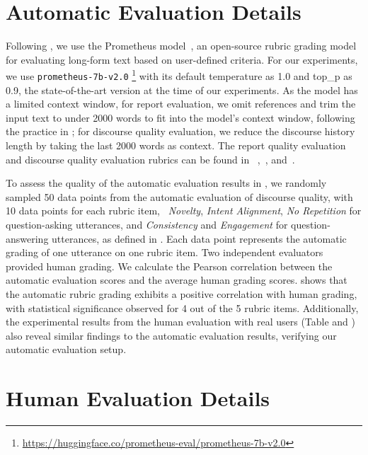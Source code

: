 \documentclass[11pt]{article}
\begin{document}
\section{Automatic Evaluation Details}
\label{appendix:rubric}
Following \citet{shao2024assisting}, we use the Prometheus model~\citep{kim2024prometheus}, an open-source rubric grading model for evaluating long-form text based on user-defined criteria. For our experiments, we use \texttt{prometheus-7b-v2.0} \footnote{\url{https://huggingface.co/prometheus-eval/prometheus-7b-v2.0}} with its default temperature as 1.0 and top\_p as 0.9, the state-of-the-art version at the time of our experiments. As the model has a limited context window, for report evaluation, we omit references and trim the input text to under 2000 words to fit into the model’s context window, following the practice in \citet{shao2024assisting}; for discourse quality evaluation, we reduce the discourse history length by taking the last 2000 words as context. The report quality evaluation and discourse quality evaluation rubrics can be found in ~,~, and~.

To assess the quality of the automatic evaluation results in , we randomly sampled 50 data points from the automatic evaluation of discourse quality, with 10 data points for each rubric item, \ie ~\textit{Novelty}, \textit{Intent Alignment}, \textit{No Repetition} for question-asking utterances, and \textit{Consistency} and \textit{Engagement} for question-answering utterances, as defined in . Each data point represents the automatic grading of one utterance on one rubric item. Two independent evaluators provided human grading. We calculate the Pearson correlation between the automatic evaluation scores and the average human grading scores.  shows that the automatic rubric grading exhibits a positive correlation with human grading, with statistical significance observed for 4 out of the 5 rubric items. Additionally, the experimental results from the human evaluation with real users (Table  and ) also reveal similar findings to the automatic evaluation results, verifying our automatic evaluation setup.


\section{Human Evaluation Details}
\label{appendix:human_eval}
\end{document}

